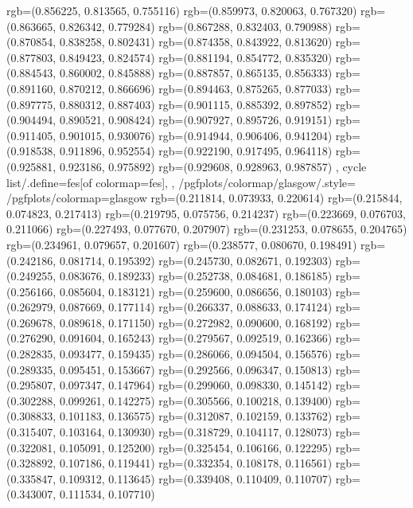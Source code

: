 {{{					rgb=(0.856225, 0.813565, 0.755116)
					rgb=(0.859973, 0.820063, 0.767320)
					rgb=(0.863665, 0.826342, 0.779284)
					rgb=(0.867288, 0.832403, 0.790988)
					rgb=(0.870854, 0.838258, 0.802431)
					rgb=(0.874358, 0.843922, 0.813620)
					rgb=(0.877803, 0.849423, 0.824574)
					rgb=(0.881194, 0.854772, 0.835320)
					rgb=(0.884543, 0.860002, 0.845888)
					rgb=(0.887857, 0.865135, 0.856333)
					rgb=(0.891160, 0.870212, 0.866696)
					rgb=(0.894463, 0.875265, 0.877033)
					rgb=(0.897775, 0.880312, 0.887403)
					rgb=(0.901115, 0.885392, 0.897852)
					rgb=(0.904494, 0.890521, 0.908424)
					rgb=(0.907927, 0.895726, 0.919151)
					rgb=(0.911405, 0.901015, 0.930076)
					rgb=(0.914944, 0.906406, 0.941204)
					rgb=(0.918538, 0.911896, 0.952554)
					rgb=(0.922190, 0.917495, 0.964118)
					rgb=(0.925881, 0.923186, 0.975892)
					rgb=(0.929608, 0.928963, 0.987857)
			},
		cycle list/.define={fes}{[of colormap=fes]},
		},
		/pgfplots/colormap/glasgow/.style={
			/pgfplots/colormap={glasgow}{%
					rgb=(0.211814, 0.073933, 0.220614)
					rgb=(0.215844, 0.074823, 0.217413)
					rgb=(0.219795, 0.075756, 0.214237)
					rgb=(0.223669, 0.076703, 0.211066)
					rgb=(0.227493, 0.077670, 0.207907)
					rgb=(0.231253, 0.078655, 0.204765)
					rgb=(0.234961, 0.079657, 0.201607)
					rgb=(0.238577, 0.080670, 0.198491)
					rgb=(0.242186, 0.081714, 0.195392)
					rgb=(0.245730, 0.082671, 0.192303)
					rgb=(0.249255, 0.083676, 0.189233)
					rgb=(0.252738, 0.084681, 0.186185)
					rgb=(0.256166, 0.085604, 0.183121)
					rgb=(0.259600, 0.086656, 0.180103)
					rgb=(0.262979, 0.087669, 0.177114)
					rgb=(0.266337, 0.088633, 0.174124)
					rgb=(0.269678, 0.089618, 0.171150)
					rgb=(0.272982, 0.090600, 0.168192)
					rgb=(0.276290, 0.091604, 0.165243)
					rgb=(0.279567, 0.092519, 0.162366)
					rgb=(0.282835, 0.093477, 0.159435)
					rgb=(0.286066, 0.094504, 0.156576)
					rgb=(0.289335, 0.095451, 0.153667)
					rgb=(0.292566, 0.096347, 0.150813)
					rgb=(0.295807, 0.097347, 0.147964)
					rgb=(0.299060, 0.098330, 0.145142)
					rgb=(0.302288, 0.099261, 0.142275)
					rgb=(0.305566, 0.100218, 0.139400)
					rgb=(0.308833, 0.101183, 0.136575)
					rgb=(0.312087, 0.102159, 0.133762)
					rgb=(0.315407, 0.103164, 0.130930)
					rgb=(0.318729, 0.104117, 0.128073)
					rgb=(0.322081, 0.105091, 0.125200)
					rgb=(0.325454, 0.106166, 0.122295)
					rgb=(0.328892, 0.107186, 0.119441)
					rgb=(0.332354, 0.108178, 0.116561)
					rgb=(0.335847, 0.109312, 0.113645)
					rgb=(0.339408, 0.110409, 0.110707)
					rgb=(0.343007, 0.111534, 0.107710)
}}}
